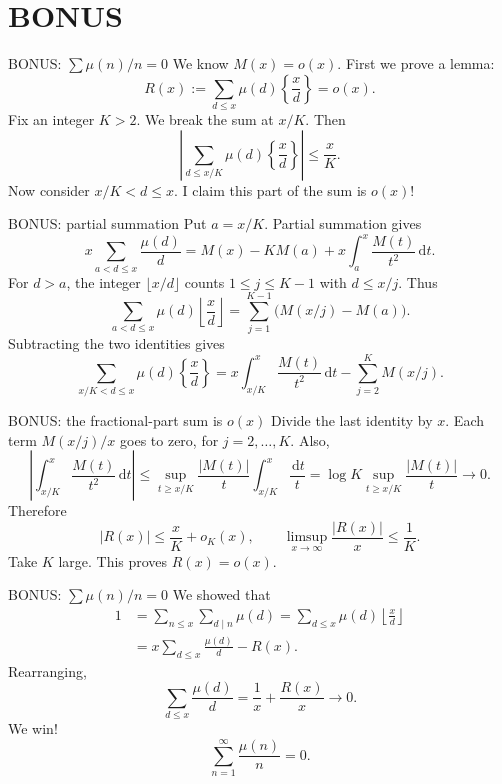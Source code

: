 \documentclass[aspectratio=169,11pt]{beamer}
\newcommand{\dd}{\,\mathrm d}
\begin{document}
\section{BONUS}
\begin{frame}{BONUS: $\sum \mu(n)/n=0$}
We know $M(x)=o(x)$. First we prove a lemma:
\[R(x):=\sum_{d\le x}\mu(d)\left\{\frac xd\right\}=o(x).\]
Fix an integer $K>2$. We break the sum at $x/K$. Then
\[\left|\sum_{d\le x/K}\mu(d)\left\{\frac xd\right\}\right|\le\frac xK.\]
Now consider $x/K<d\le x$. I claim this part of the sum is $o(x)$!
\end{frame}
\begin{frame}{BONUS: partial summation}
\small
Put $a=x/K$. Partial summation gives
\[x\sum_{a<d\le x}\frac{\mu(d)}d=M(x)-KM(a)+x\int_a^x\frac{M(t)}{t^2}\dd t.\]
For $d>a$, the integer $\lfloor x/d\rfloor$ counts $1\le j\le K-1$ with $d\le x/j$. Thus
\[\sum_{a<d\le x}\mu(d)\left\lfloor\frac xd\right\rfloor
=\sum_{j=1}^{K-1}\bigl(M(x/j)-M(a)\bigr).\]
Subtracting the two identities gives
\[\sum_{x/K<d\le x}\mu(d)\left\{\frac xd\right\}
=x\int_{x/K}^x\frac{M(t)}{t^2}\dd t-\sum_{j=2}^K M(x/j).\]
\end{frame}
\begin{frame}{BONUS: the fractional-part sum is $o(x)$}
Divide the last identity by $x$. Each term $M(x/j)/x$ goes to zero, for $j=2,\ldots,K$. Also,
\[\left|\int_{x/K}^x\frac{M(t)}{t^2}\dd t\right|
\le\sup_{t\ge x/K}\frac{|M(t)|}t\int_{x/K}^x\frac{\dd t}t
=\log K\sup_{t\ge x/K}\frac{|M(t)|}t\longrightarrow0.\]
Therefore
\[|R(x)|\le\frac xK+o_K(x),\qquad
\limsup_{x\to\infty}\frac{|R(x)|}x\le\frac1K.\]
Take $K$ large. This proves $R(x)=o(x)$.
\end{frame}
\begin{frame}{BONUS: $\sum \mu(n)/n=0$}
We showed that
\begin{align*}
1&=\sum_{n\le x}\sum_{d\mid n}\mu(d)
=\sum_{d\le x}\mu(d)\left\lfloor\frac xd\right\rfloor\\
&=x\sum_{d\le x}\frac{\mu(d)}d-R(x).
\end{align*}
Rearranging,
\[\sum_{d\le x}\frac{\mu(d)}d=\frac1x+\frac{R(x)}x\longrightarrow0.\]
We win!
\[\boxed{\displaystyle\sum_{n=1}^\infty\frac{\mu(n)}n=0.}\]
\end{frame}


\end{document}
